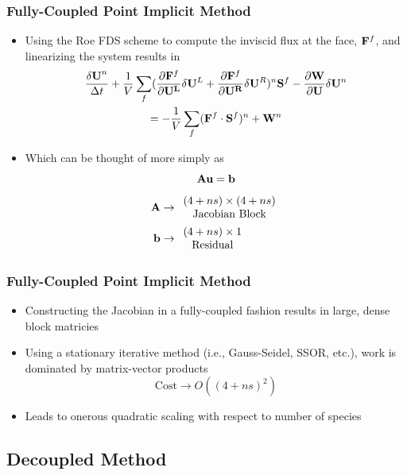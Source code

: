 \documentclass{beamer}
\begin{document}
\begin{frame}
  \frametitle{Fully-Coupled Point Implicit Method}
  \begin{itemize}
  \item Using the Roe FDS scheme to compute the inviscid flux at the face,
    $\mathbf F^f$, and linearizing the system results in
  \begin{multline*}
  	\frac{\mathbf{\delta U}^n}{\Delta t}
    +\frac{1}{V}\sum\limits_{f}(\frac{\partial \mathbf F^f}
    {\partial \mathbf{U^L}}\delta\mathbf U^L
  	+\frac{\partial \mathbf F^f}{\partial \mathbf{U^R}}\delta\mathbf U^R)^n \mathbf S^f
  	- \frac{\partial \mathbf W}{\partial \mathbf U}\delta\mathbf U^n \\
  	= -\frac{1}{V}\sum\limits_{f}(\mathbf F^f\cdot\mathbf S^f)^n + \mathbf W^n
  \end {multline*}
  \item Which can be thought of more simply as
  \[
    \mathbf A\mathbf u = \mathbf b
  \]
  \vspace{-0.7cm}
  \begin{align*}
    \mathbf A &\to
    \begin{array}{c}
      (4+ns) \times (4+ns) \\
      \text{Jacobian Block}
    \end{array} \\
    \mathbf b &\to
    \begin{array}{c}
      (4+ns) \times 1 \\
      \text{Residual}
    \end{array}
  \end{align*}
  \end{itemize}
\end{frame}
\begin{frame}
  \frametitle{Fully-Coupled Point Implicit Method}
  \begin{itemize}
    \item Constructing the Jacobian in a fully-coupled fashion results in large,
      dense block matricies
    \item Using a stationary iterative method (i.e., Gauss-Seidel, SSOR, etc.),
      work is dominated by matrix-vector products
      \[
        \text{Cost} \to O((4+ns)^2)
      \]
    \item Leads to onerous quadratic scaling with respect to number of species
  \end{itemize}
\end{frame}

\subsection{Decoupled Method}
\end{document}
